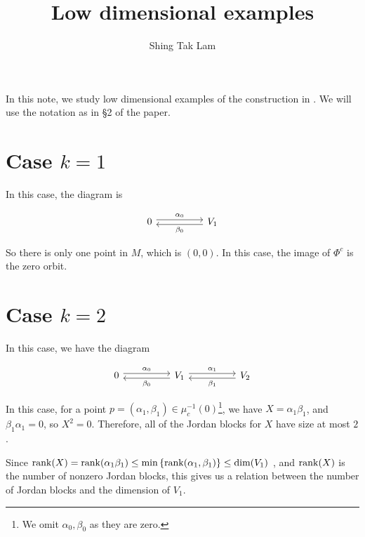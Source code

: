 \documentclass{article}
\title{Low dimensional examples}
\author{Shing Tak Lam}
\begin{document}
\maketitle

In this note, we study low dimensional examples of the construction in \cite{kobak_classical_1996}. We will use the notation as in \S 2 of the paper.

\section{Case \(k=1\)}

In this case, the diagram is

\[\begin{tikzcd}
	0 && {V_1}
	\arrow["{\alpha_0}", shift left=1, from=1-1, to=1-3]
	\arrow["{\beta_0}", shift left=1, from=1-3, to=1-1]
\end{tikzcd}\]

So there is only one point in \(M\), which is \((0, 0)\). In this case, the image of \(\Phi^c\) is the zero orbit.

\section{Case \(k=2\)}

In this case, we have the diagram

\[\begin{tikzcd}
	0 && {V_1} && {V_2}
	\arrow["{\alpha_0}", shift left=1, from=1-1, to=1-3]
	\arrow["{\beta_0}", shift left=1, from=1-3, to=1-1]
	\arrow["{\alpha_1}", shift left=1, from=1-3, to=1-5]
	\arrow["{\beta_1}", shift left=1, from=1-5, to=1-3]
\end{tikzcd}\]

In this case, for a point \(p = (\alpha_1, \beta_1) \in \mu_c^{-1}(0)\)\footnote{We omit \(\alpha_0, \beta_0\) as they are zero.}, we have \(X = \alpha_1\beta_1\), and \(\beta_1\alpha_1 = 0\), so \(X^2 = 0\). Therefore, all of the Jordan blocks for \(X\) have size at most \(2\).

Since \(\rank(X) = \rank(\alpha_1\beta_1) \le \min\left\{\rank(\alpha_1, \beta_1)\right\} \le \dim(V_1)\) , and \(\rank(X)\) is the number of nonzero Jordan blocks, this gives us a relation between the number of Jordan blocks and the dimension of \(V_1\).

\printbibliography
\end{document}
